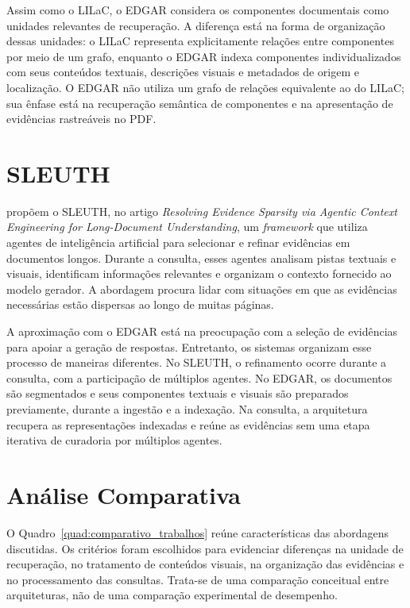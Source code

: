 Assim como o LILaC, o EDGAR considera os componentes documentais como unidades relevantes de recuperação. A diferença está na forma de organização dessas unidades: o LILaC representa explicitamente relações entre componentes por meio de um grafo, enquanto o EDGAR indexa componentes individualizados com seus conteúdos textuais, descrições visuais e metadados de origem e localização. O EDGAR não utiliza um grafo de relações equivalente ao do LILaC; sua ênfase está na recuperação semântica de componentes e na apresentação de evidências rastreáveis no PDF.

\section{SLEUTH}
\label{sec:sleuth}

 propõem o SLEUTH, no artigo \textit{Resolving Evidence Sparsity via Agentic Context Engineering for Long-Document Understanding}, um \textit{framework} que utiliza agentes de inteligência artificial para selecionar e refinar evidências em documentos longos. Durante a consulta, esses agentes analisam pistas textuais e visuais, identificam informações relevantes e organizam o contexto fornecido ao modelo gerador. A abordagem procura lidar com situações em que as evidências necessárias estão dispersas ao longo de muitas páginas.

A aproximação com o EDGAR está na preocupação com a seleção de evidências para apoiar a geração de respostas. Entretanto, os sistemas organizam esse processo de maneiras diferentes. No SLEUTH, o refinamento ocorre durante a consulta, com a participação de múltiplos agentes. No EDGAR, os documentos são segmentados e seus componentes textuais e visuais são preparados previamente, durante a ingestão e a indexação. Na consulta, a arquitetura recupera as representações indexadas e reúne as evidências sem uma etapa iterativa de curadoria por múltiplos agentes.

\section{Análise Comparativa}
\label{subsec:analise-comparativa}

O Quadro~\ref{quad:comparativo_trabalhos} reúne características das abordagens discutidas. Os critérios foram escolhidos para evidenciar diferenças na unidade de recuperação, no tratamento de conteúdos visuais, na organização das evidências e no processamento das consultas. Trata-se de uma comparação conceitual entre arquiteturas, não de uma comparação experimental de desempenho.

